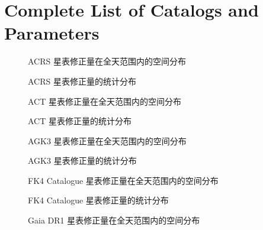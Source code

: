 \documentclass{aastex701}
\begin{document}



\appendix

\section{Complete List of Catalogs and Parameters} \label{app:catalogs}

\begin{figure}[ht!]
\caption{ACRS 星表修正量在全天范围内的空间分布}
\label{fig:bias_acrs_2x2}
\end{figure}

\begin{figure}[ht!]
\caption{ACRS 星表修正量的统计分布}
\label{fig:hist_acrs}
\end{figure}

\begin{figure}[ht!]
\caption{ACT 星表修正量在全天范围内的空间分布}
\label{fig:bias_act_2x2}
\end{figure}

\begin{figure}[ht!]
\caption{ACT 星表修正量的统计分布}
\label{fig:hist_act}
\end{figure}

\begin{figure}[ht!]
\caption{AGK3 星表修正量在全天范围内的空间分布}
\label{fig:bias_agk3_2x2}
\end{figure}

\begin{figure}[ht!]
\caption{AGK3 星表修正量的统计分布}
\label{fig:hist_agk3}
\end{figure}

\begin{figure}[ht!]
\caption{FK4 Catalogue 星表修正量在全天范围内的空间分布}
\label{fig:bias_fk4catalogue_2x2}
\end{figure}

\begin{figure}[ht!]
\caption{FK4 Catalogue 星表修正量的统计分布}
\label{fig:hist_fk4catalogue}
\end{figure}

\begin{figure}[ht!]
\caption{Gaia DR1 星表修正量在全天范围内的空间分布}
\label{fig:bias_gaiadr1_2x2}
\end{figure}
\end{document}
